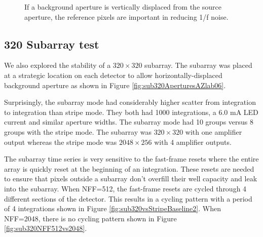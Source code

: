 \documentclass{aastex62}
\begin{document}
\begin{figure}
{}
{}
\caption{If a background aperture is vertically displaced from the source aperture, the reference pixels are important in reducing 1/f noise.}\label{fig:RefpixWithVertOffsetBackground}
\end{figure}

\clearpage
\subsection{320 Subarray test}
We also explored the stability of a $320 \times 320$ subarray.
The subarray was placed at a strategic location on each detector to allow horizontally-displaced background aperture as shown in Figure \ref{fig:sub320AperturesAZlab06}.

Surprisingly, the subarray mode had considerably higher scatter from integration to integration than stripe mode.
They both had 1000 integrations, a 6.0 mA LED current and similar aperture widths.
The subarray mode had 10 groups versus 8 groups with the stripe mode.
The subarray was $320 \times 320$ with one amplifier output whereas the stripe mode was $2048 \times 256$ with 4 amplifier outputs.

The subarray time series is very sensitive to the fast-frame resets where the entire array is quickly reset at the beginning of an integration.
These resets are needed to ensure that pixels outside a subarray don't overfill their well capacity and leak into the subarray.
When NFF=512, the fast-frame resets are cycled through 4 different sections of the detector.
This results in a cycling pattern with a period of 4 integrations shown in Figure \ref{fig:sub320vsStripeBaseline2}.
When NFF=2048, there is no cycling pattern shown in Figure \ref{fig:sub320NFF512vs2048}.
\end{document}
